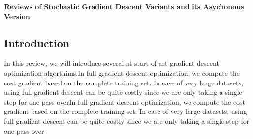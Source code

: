 \documentclass[]{book}
\theoremstyle{definition}
\begin{document}
\begin{center}
{\Large{ \textbf{Reviews of Stochastic Gradient Descent Variants and its Asychonous Version}}}\\
\end{center}

\vspace{0.2 cm}


\subsection*{Introduction}
In this review, we will introduce several at start-of-art gradient descent optimization algorthims.In full gradient descent optimization, we compute the cost gradient based on the complete training set. In case of very large datasets, using full gradient descent can be quite costly since we are only taking a single step for one pass overIn full gradient descent optimization, we compute the cost gradient based on the complete training set. In case of very large datasets, using full gradient descent can be quite costly since we are only taking a single step for one pass over
\end{document}
